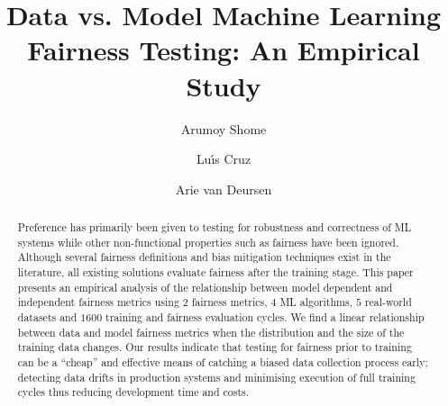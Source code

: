 \documentclass[sigconf,review,anonymous]{acmart}
\begin{document}
\title{Data vs. Model Machine Learning Fairness Testing: An Empirical Study}


\author{Arumoy Shome}

\author{Lu{\'\i}s Cruz}

\author{Arie van Deursen}

\renewcommand{\shortauthors}{Trovato et al.}

\begin{abstract}

  Preference has primarily been given to testing for robustness and
  correctness of ML systems while other non-functional properties such
  as fairness have been ignored. Although several fairness definitions
  and bias mitigation techniques exist in the literature, all existing
  solutions evaluate fairness after the training stage. This paper
  presents an empirical analysis of the relationship between model
  dependent and independent fairness metrics using $2$ fairness
  metrics, $4$ ML algorithms, $5$ real-world datasets and $1600$
  training and fairness evaluation cycles. We find a linear
  relationship between data and model fairness metrics when the
  distribution and the size of the training data changes. Our results
  indicate that testing for fairness prior to training can be a
  ``cheap'' and effective means of catching a biased data collection
  process early; detecting data drifts in production systems and
  minimising execution of full training cycles thus reducing
  development time and costs.

\end{abstract}

\maketitle
\end{document}
